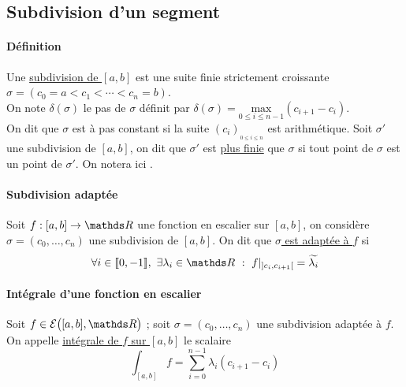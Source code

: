 	\subsection{Subdivision d'un segment}
		\traitd
		\paragraph{Définition}
			Une \underline{subdivision de $[a,b]$} est une suite finie strictement croissante $\sigma = (c_0=a<c_1<\cdots 
			<c_n=b)$. \\ On note $\delta(\sigma )$ le pas de $\sigma$ définit par $\delta(\sigma)= \underset{0\leq i\leq n-1}{\mathrm{max}} 
			(c_{i+1}-c_i)$. \\ On dit que $\sigma$ est à pas constant si la suite $(c_i)_{_{0\leq i \leq n}}$ est arithmétique. \trait
		Soit $\sigma'$ une subdivision de $[a,b]$, on dit que $\sigma'$ est \underline{plus finie} que $\sigma$ si tout point de $\sigma$ est un 
		point de $\sigma'$. On notera ici . \traitd
		\paragraph{Subdivision adaptée}
			Soit $f: [a,b] \rightarrow \R$ une fonction en escalier sur $[a,b]$, on considère $\sigma = (c_0 , \dots ,c_n)$ une subdivision de 
			$[a,b]$. On dit que \underline{$\sigma$ est adaptée à $f$} si \[ \forall i\in\ent{0,-1} ,~\exists \lambda_i \in \R ~:~ 
			f|_{]c_i,c_{i+1}[} = \widetilde{\lambda_i} \] \vspace*{-0.7cm} \trait
		\traitd
		\paragraph{Intégrale d'une fonction en escalier}
			Soit $f \in \Esc$ ; soit $\sigma = (c_0,\dots ,c_n)$ une subdivision adaptée à $f$. \\ On appelle \underline{intégrale de $f$ sur 
			$[a,b]$} le scalaire \[ \int_{[a,b]}  f = \sum_{i=0}^{n-1} \lambda_i (c_{i+1}-c_i)\] \vspace*{-0.7cm} \trait
		\vspace*{0.5cm} \\  \\
